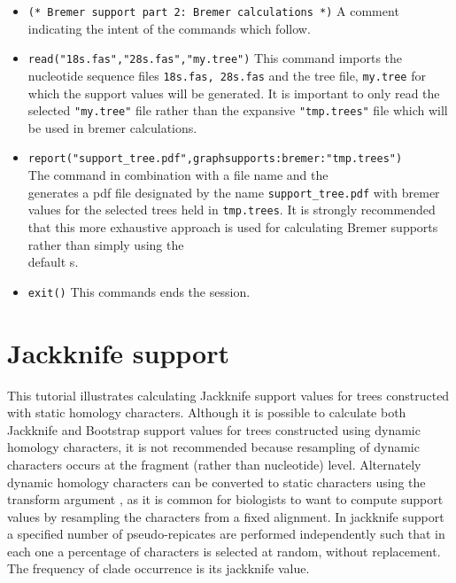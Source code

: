\begin{itemize}
\item \texttt{(* Bremer support part 2: Bremer calculations *)}  A comment indicating the intent of the commands which follow.
\item \texttt{read("18s.fas","28s.fas","my.tree")} This command imports the nucleotide sequence files \texttt{18s.fas, 28s.fas} and the tree file, \texttt{my.tree} for which the support values will be generated.  It is important to only read the selected \texttt{"my.tree"} file rather than the expansive  \texttt{"tmp.trees"} file which will be used in bremer calculations.
\item \texttt{report("support\_tree.pdf",graphsupports:bremer:"tmp.trees")} \\The {} command in combination with a file name and the \\  generates a pdf file designated by the name \texttt{support\_tree.pdf} with bremer values for the selected trees held in \texttt{tmp.trees}.  It is strongly recommended that this more exhaustive approach is used for calculating Bremer supports rather than simply using the \\  default s.  
\item \texttt{exit()} This commands ends the \poy session.
\end{itemize}

\section{Jackknife support}{\label{tutorial4.4}}

This tutorial illustrates calculating Jackknife support values for trees constructed with static homology characters.  Although it is possible to calculate both Jackknife and Bootstrap support values for trees constructed using dynamic homology characters, it is not recommended because resampling of dynamic characters occurs at the fragment (rather than nucleotide) level. Alternately dynamic homology characters can be converted to static characters using the transform argument , as it is common for biologists to want to  compute support values by resampling the characters from a fixed alignment.  In jackknife support a specified number of pseudo-repicates are performed independently such that in each one a percentage of characters is selected at random, without replacement.  The frequency of clade occurrence is its jackknife value.  

